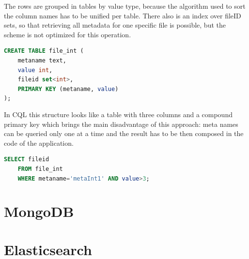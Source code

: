 The rows are grouped
in tables by value type, because the algorithm used to sort the
column names has to be unified per table. There also is an index over fileID sets, 
so that retrieving all metadata for one specific file is possible, but the scheme is 
not optimized for this operation.



\begin{lstlisting}[language=sql, caption=Data structure described by CQL]
CREATE TABLE file_int (
    metaname text,
    value int,
    fileid set<int>,
    PRIMARY KEY (metaname, value)
);
\end{lstlisting}

In CQL this structure looks like a table with three columns and a compound primary key which
brings the main disadvantage of this approach: meta names can be queried only one at a time and
the result has to be then composed in the code of the application.

\begin{lstlisting}[language=sql, caption=Example query]
SELECT fileid 
	FROM file_int 
	WHERE metaname='metaInt1' AND value>3;
\end{lstlisting}

\section{MongoDB}

\section{Elasticsearch}

